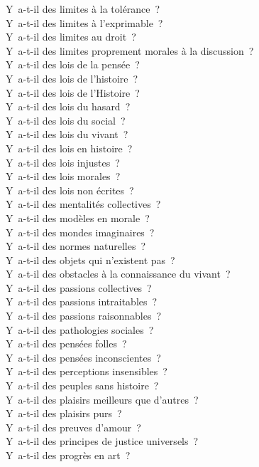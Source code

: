 \documentclass[a4paper,12pt]{article}
\begin{document}
Y a-t-il des limites à la tolérance ? \\
Y a-t-il des limites à l'exprimable ? \\
Y a-t-il des limites au droit ? \\
Y a-t-il des limites proprement morales à la discussion ? \\
Y a-t-il des lois de la pensée ? \\
Y a-t-il des lois de l'histoire ? \\
Y a-t-il des lois de l'Histoire ? \\
Y a-t-il des lois du hasard ? \\
Y a-t-il des lois du social ? \\
Y a-t-il des lois du vivant ? \\
Y a-t-il des lois en histoire ? \\
Y a-t-il des lois injustes ? \\
Y a-t-il des lois morales ? \\
Y a-t-il des lois non écrites ? \\
Y a-t-il des mentalités collectives ? \\
Y a-t-il des modèles en morale ? \\
Y a-t-il des mondes imaginaires ? \\
Y a-t-il des normes naturelles ? \\
Y a-t-il des objets qui n'existent pas ? \\
Y a-t-il des obstacles à la connaissance du vivant ? \\
Y a-t-il des passions collectives ? \\
Y a-t-il des passions intraitables ? \\
Y a-t-il des passions raisonnables ? \\
Y a-t-il des pathologies sociales ? \\
Y a-t-il des pensées folles ? \\
Y a-t-il des pensées inconscientes ? \\
Y a-t-il des perceptions insensibles ? \\
Y a-t-il des peuples sans histoire ? \\
Y a-t-il des plaisirs meilleurs que d'autres ? \\
Y a-t-il des plaisirs purs ? \\
Y a-t-il des preuves d'amour ? \\
Y a-t-il des principes de justice universels ? \\
Y a-t-il des progrès en art ? \\
\end{document}
